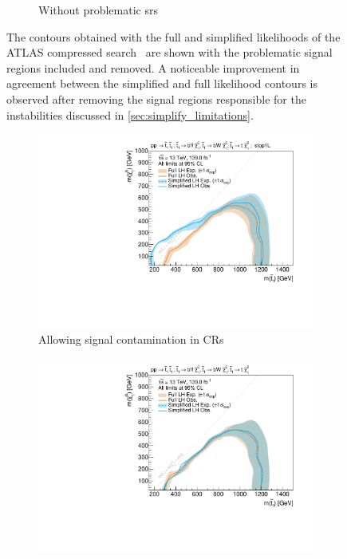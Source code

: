 \begin{figure}[H]
\begin{subfigure}[b]{0.47\textwidth}
		\caption{Without problematic \glspl{sr}\label{fig:exclusion_compressed_CLs_noLabel_v2_withoutCRs}}
	\end{subfigure}\hfill
	\caption{The contours obtained with the full and simplified likelihoods of the ATLAS compressed search~\cite{SUSY-2018-16} are shown with the problematic signal regions  included and  removed. A noticeable improvement in agreement between the simplified and full likelihood contours is observed after removing the signal regions responsible for the instabilities discussed in \cref{sec:simplify_limitations}.}\label{fig:limitations_simplied_compressed}
\end{figure}
\begin{figure}[H]
	\centering
		\captionsetup[subfigure]{aboveskip=-3pt,belowskip=-2pt}
	\begin{subfigure}[b]{0.47\textwidth}
		\centering\includegraphics[width=\textwidth]{exclusion_stop1L_withCRs_noLabel_v2}
		\caption{Allowing signal contamination in CRs\label{fig:exclusion_stop1L_noLabel_v2_withCRs}}
	\end{subfigure}\hfill
	\begin{subfigure}[b]{0.47\textwidth}
		\centering\includegraphics[width=\textwidth]{exclusion_stop1L_noLabel_v2}

\end{subfigure}
\end{figure}
